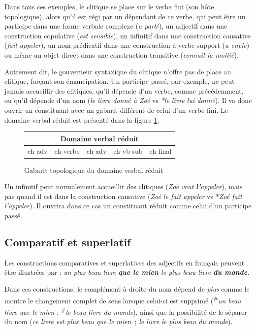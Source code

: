 Dans tous ces exemples, le clitique se place sur le verbe fini (son hôte topologique), alors qu’il est régi par un dépendant de ce verbe, qui peut être un participe dans une forme verbale complexe (\textit{a parlé}), un adjectif dans une construction copulative (\textit{est sensible}), un infinitif dans une construction causative (\textit{fait appeler}), un nom prédicatif dans une construction à verbe support (\textit{a envie}) ou même un objet direct dans une construction transitive (\textit{connaît la moitié}).

Autrement dit, le gouverneur syntaxique du clitique n’offre pas de place au clitique, forçant son émancipation. Un participe passé, par exemple, ne peut jamais accueillir des clitiques, qu’il dépende d’un verbe, comme précédemment, ou qu’il dépende d’un nom (\textit{le livre donné à Zoé} vs \textit{*le livre lui donné}). Il va donc ouvrir un constituant avec un gabarit différent de celui d’un verbe fini.
Le domaine verbal réduit est présenté dans la figure \ref{fig:gabarit-verbal-reduit}.

\begin{figure}
\caption{\label{fig:gabarit-verbal-reduit}Gabarit topologique du domaine verbal réduit}
\def\arraystretch{1.5}
\setlength{\tabcolsep}{3ex}
\begin{tabular}{|c|c|c|c|c|}
\hline
\multicolumn{5}{|c|}{\cellcolor{lsDOIGray}Domaine verbal réduit}\\
\hline
ch-adv & \cellcolor{lsDOIGray}ch-verbe & ch-adv & ch-vb-sub & ch-final\\
\hline
\end{tabular}
\end{figure}

Un infinitif peut normalement accueillir des clitiques (\textit{Zoé veut} \textbf{\textit{l’}}\textit{appeler}), mais pas quand il est dans la construction causative (\textit{Zoé le fait appeler} vs *\textit{Zoé fait l'appeler}). Il ouvrira dans ce cas un constituant réduit comme celui d’un participe passé.

\subsection{Comparatif et superlatif}
Les constructions comparatives et superlatives des adjectifs en français peuvent être illustrées par :
\ea\label{ex:plus}
\ea \itshape un plus beau livre \textbf{que le mien}
\ex \itshape le plus beau livre \textbf{du monde}.
\z
\z

Dans ces constructions, le complément à droite du nom dépend de \textit{plus} comme le montre le changement complet de sens lorsque celui-ci est supprimé (\textsuperscript{\#}\textit{un beau livre que le mien} ; \textsuperscript{\#}\textit{le beau livre du monde}), ainsi que la possibilité de le séparer du nom (\textit{ce livre est plus beau que le mien~}; \textit{le livre le plus beau du monde}).

